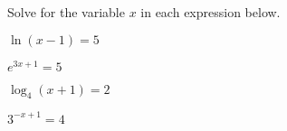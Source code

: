 
\begin{problem}
\item Solve for the variable $x$ in each expression below.
  \begin{subproblem}
  \item $\ln(x-1)=5$
    \vfill
  \item $e^{3x+1} = 5$
    \vfill
  \item $\log_4(x+1) = 2$
    \vfill
  \item $3^{-x+1} = 4$
    \vfill
  \end{subproblem}
\end{problem}


